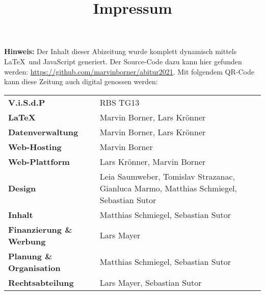 \title{Impressum}


\textbf{Hinweis:} Der Inhalt dieser Abizeitung wurde komplett dynamisch mittels \LaTeX\  und JavaScript generiert. Der Source-Code dazu kann hier gefunden werden: \url{https://github.com/marvinborner/abitur2021}. Mit folgendem QR-Code kann diese Zeitung auch digital genossen werden:

\begin{center}
\end{center}

\begin{table}[b]
	\begin{tabular}{ l l }
		\textbf{V.i.S.d.P}               & RBS TG13                                                                                \\ %
		\textbf{\LaTeX}                  & Marvin Borner, Lars Krönner                                                             \\
		\textbf{Datenverwaltung}         & Marvin Borner, Lars Krönner                                                             \\
		\textbf{Web-Hosting}             & Marvin Borner                                                                           \\
		\textbf{Web-Plattform}           & Lars Krönner, Marvin Borner                                                             \\
		\textbf{Design}                  & Leia Saumweber, Tomislav Strazanac, Gianluca Marmo, Matthias Schmiegel, Sebastian Sutor \\
		\textbf{Inhalt}                  & Matthias Schmiegel, Sebastian Sutor                                                     \\
		\textbf{Finanzierung \& Werbung} & Lars Mayer                                                                              \\
		\textbf{Planung \& Organisation} & Matthias Schmiegel, Sebastian Sutor                                                     \\
		\textbf{Rechtsabteilung}         & Lars Mayer, Sebastian Sutor
	\end{tabular}
\end{table}
